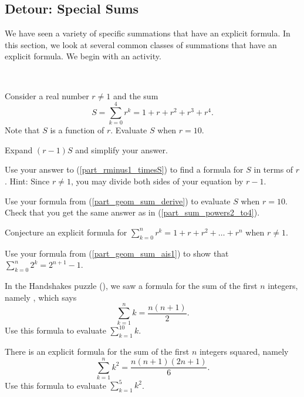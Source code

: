 
\newcommand{\subspecialsum}{Detour: Special Sums}  
\subsection{\subspecialsum}
\label{sub_special_sums}

We have seen a variety of specific summations that have an explicit formula.  In this section, we look at several common classes of summations that have an explicit formula.  We begin with an activity.

\begin{act}
\label{act_special sums}
~
    \begin{apart}
        \item \label{part_sum_powers2_to4} Consider a real number $r \neq 1$ and the sum $$S =  \sum_{k=0}^4r^k = 1 + r + r^2 + r^3 + r^4.$$   Note that $S$ is a function of $r$. Evaluate $S$ when $r = 10$.
        
        \item \label{part_rminus1_timesS} Expand $(r-1)S$ and simplify your answer.
        
        \item \label{part_geom_sum_derive} Use your answer to (\ref{part_rminus1_timesS}) to find a formula for $S$ in terms of $r$.  Hint: Since $r \neq 1$, you may divide both sides of your equation by $r-1$.
            
        \item Use your formula from (\ref{part_geom_sum_derive}) to evaluate $S$ when $r=10$. Check that you get the same answer as in (\ref{part_sum_powers2_to4}).
            
        \item \label{part_geom_sum_ais1} Conjecture an explicit formula for $\displaystyle \sum_{k=0}^nr^k = 1 + r + r^2 + \ldots + r^n$ when $r \neq 1$.

        \item Use your formula from (\ref{part_geom_sum_ais1}) to show that $\displaystyle \sum_{k=0}^n2^k = 2^{n+1}-1$.

        \item In the Handshakes puzzle (), we saw a formula for the sum of the first $n$ integers, namely , which says $$\sum_{k=1}^nk=\frac{n(n+1)}{2}.$$  Use this formula to evaluate $\displaystyle \sum_{k=1}^{10}k$.

        \item \label{part_sum_sq_formula} There is an explicit formula for the sum of the first $n$ integers squared, namely $$\sum_{k=1}^nk^2=\frac{n(n+1)(2n+1)}{6}.$$  Use this formula to evaluate $\displaystyle \sum_{k=1}^{5}k^2$.


\end{apart}
\end{act}
